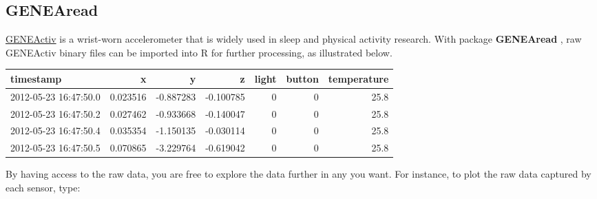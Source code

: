 \documentclass[]{book}
\newenvironment{Shaded}{\begin{snugshade}}{\end{snugshade}}
\newcommand{\KeywordTok}[1]{\textcolor[rgb]{0.13,0.29,0.53}{\textbf{#1}}}
\newcommand{\DataTypeTok}[1]{\textcolor[rgb]{0.13,0.29,0.53}{#1}}
\newcommand{\DecValTok}[1]{\textcolor[rgb]{0.00,0.00,0.81}{#1}}
\newcommand{\StringTok}[1]{\textcolor[rgb]{0.31,0.60,0.02}{#1}}
\newcommand{\CommentTok}[1]{\textcolor[rgb]{0.56,0.35,0.01}{\textit{#1}}}
\newcommand{\OtherTok}[1]{\textcolor[rgb]{0.56,0.35,0.01}{#1}}
\newcommand{\OperatorTok}[1]{\textcolor[rgb]{0.81,0.36,0.00}{\textbf{#1}}}
\newcommand{\NormalTok}[1]{#1}
\begin{document}
\subsection{GENEAread}\label{genearead}


\href{https://www.geneactiv.org/}{GENEActiv} is a wrist-worn
accelerometer that is widely used in sleep and physical activity
research. With package \textbf{GENEAread} \citep{R_GENEAread}, raw
GENEActiv binary files can be imported into R for further processing, as
illustrated below.

\begin{Shaded}
\end{Shaded}

\begin{tabular}{l|r|r|r|r|r|r}
\hline
timestamp & x & y & z & light & button & temperature\\
\hline
2012-05-23 16:47:50.0 & 0.023516 & -0.887283 & -0.100785 & 0 & 0 & 25.8\\
\hline
2012-05-23 16:47:50.2 & 0.027462 & -0.933668 & -0.140047 & 0 & 0 & 25.8\\
\hline
2012-05-23 16:47:50.4 & 0.035354 & -1.150135 & -0.030114 & 0 & 0 & 25.8\\
\hline
2012-05-23 16:47:50.5 & 0.070865 & -3.229764 & -0.619042 & 0 & 0 & 25.8\\
\hline
\end{tabular}

By having access to the raw data, you are free to explore the data
further in any you want. For instance, to plot the raw data captured by
each sensor, type:
\end{document}
